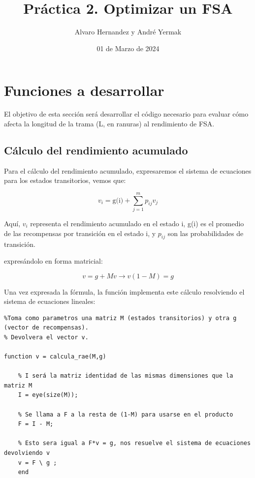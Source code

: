 \documentclass{article}
\title{Práctica 2. Optimizar un FSA}
\author{Alvaro Hernandez y André Yermak}
\date{01 de Marzo de 2024}
\begin{document}
\maketitle




\section{Funciones a desarrollar}
El objetivo de esta sección será desarrollar el código necesario para evaluar cómo afecta la longitud de la trama (L, en ranuras) al rendimiento de FSA.

\subsection{Cálculo del rendimiento acumulado}

Para el cálculo del rendimiento acumulado, expresaremos el sistema de ecuaciones para los estados transitorios, vemos que:


\[v_i = \text{g(i)} + \sum_{j=1}^{m}p_{ij}v_j\]

Aquí, $v_i$ representa el rendimiento acumulado en el estado i, g(i) es el promedio de las recompensas por transición en el estado i, y $p_{ij}$ son las probabilidades de transición.

expresándolo en  forma matricial:

\[v = g + Mv \xrightarrow{} v(1-M) = g\]

Una vez expresada la fórmula, la función implementa este cálculo resolviendo el sistema de ecuaciones lineales:

\quad

\begin{verbatim}
%Toma como parametros una matriz M (estados transitorios) y otra g (vector de recompensas).
% Devolvera el vector v.

function v = calcula_rae(M,g) 

    % I será la matriz identidad de las mismas dimensiones que la matriz M
    I = eye(size(M)); 

    % Se llama a F a la resta de (1-M) para usarse en el producto 
    F = I - M;
    
    % Esto sera igual a F*v = g, nos resuelve el sistema de ecuaciones devolviendo v
    v = F \ g ; 
    end
\end{verbatim}
\end{document}
